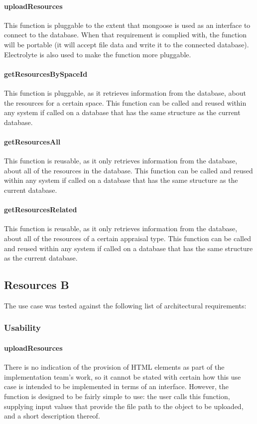 \documentclass[a4paper]{article}
\begin{document}
\paragraph{uploadResources}
This function is pluggable to the extent that mongoose is used as an interface to connect to the database. When that requirement is complied with, the function will be portable (it will accept file data and write it to the connected database). Electrolyte is also used to make the function more pluggable.

\paragraph{getResourcesBySpaceId}
This function is pluggable, as it retrieves information from the database, about the resources for a certain space. This function can be called and reused within any system if called on a database that has the same structure as the current database.

\paragraph{getResourcesAll}
This function is reusable, as it only retrieves information from the database, about all of the resources in the database. This function can be called and reused within any system if called on a database that has the same structure as the current database.

\paragraph{getResourcesRelated}
This function is reusable, as it only retrieves information from the database, about all of the resources of a certain appraisal type. This function can be called and reused within any system if called on a database that has the same structure as the current database.


\subsection {Resources B}
The use case was tested against the following list of architectural requirements:
\subsubsection {Usability}

\paragraph{uploadResources}
There is no indication of the provision of HTML elements as part of the implementation team’s work, so it cannot be stated with certain how this use case is intended to be implemented in terms of an interface. However, the function is designed to be fairly simple to use: the user calls this function, supplying input values that provide the file path to the object to be uploaded, and a short description thereof.
\end{document}
